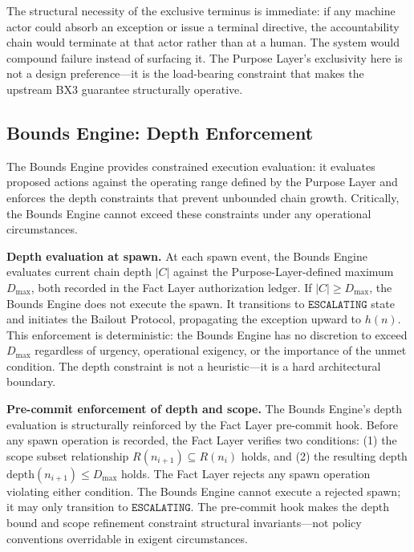 The structural necessity of the exclusive terminus is immediate: if any machine actor could absorb an exception or issue a terminal directive, the accountability chain would terminate at that actor rather than at a human. The system would compound failure instead of surfacing it. The Purpose Layer's exclusivity here is not a design preference---it is the load-bearing constraint that makes the upstream BX3 guarantee structurally operative.

\subsection{Bounds Engine: Depth Enforcement}
\label{sec:rs-bounds-depth}

The Bounds Engine provides constrained execution evaluation: it evaluates proposed actions against the operating range defined by the Purpose Layer and enforces the depth constraints that prevent unbounded chain growth. Critically, the Bounds Engine cannot exceed these constraints under any operational circumstances.

\medskip
\noindent\textbf{Depth evaluation at spawn.} At each spawn event, the Bounds Engine evaluates current chain depth $|C|$ against the Purpose-Layer-defined maximum $D_{\mathrm{max}}$, both recorded in the Fact Layer authorization ledger. If $|C| \geq D_{\mathrm{max}}$, the Bounds Engine does not execute the spawn. It transitions to $\texttt{ESCALATING}$ state and initiates the Bailout Protocol, propagating the exception upward to $h(n)$. This enforcement is deterministic: the Bounds Engine has no discretion to exceed $D_{\mathrm{max}}$ regardless of urgency, operational exigency, or the importance of the unmet condition. The depth constraint is not a heuristic---it is a hard architectural boundary.

\medskip
\noindent\textbf{Pre-commit enforcement of depth and scope.} The Bounds Engine's depth evaluation is structurally reinforced by the Fact Layer pre-commit hook. Before any spawn operation is recorded, the Fact Layer verifies two conditions: (1) the scope subset relationship $R(n_{i+1}) \subseteq R(n_i)$ holds, and (2) the resulting depth $\mathrm{depth}(n_{i+1}) \leq D_{\mathrm{max}}$ holds. The Fact Layer rejects any spawn operation violating either condition. The Bounds Engine cannot execute a rejected spawn; it may only transition to $\texttt{ESCALATING}$. The pre-commit hook makes the depth bound and scope refinement constraint structural invariants---not policy conventions overridable in exigent circumstances.

